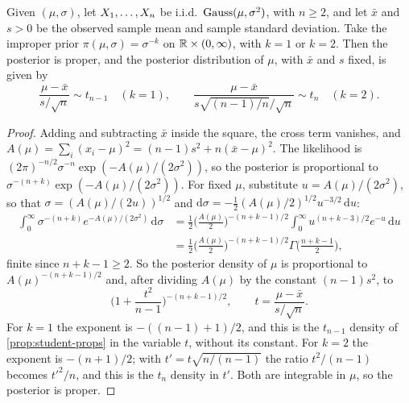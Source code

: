 \begin{proposition}
\label{prop:jeff-t-posterior}
Given $(\mu, \sigma)$, let $X_1, \ldots, X_n$ be i.i.d.\ $\text{Gauss}(\mu, \sigma^2)$, with $n \geq 2$, and let $\bar{x}$ and $s > 0$ be the observed sample mean and sample standard deviation. Take the improper prior $\pi(\mu, \sigma) = \sigma^{-k}$ on $\mathbb{R} \times (0, \infty)$, with $k = 1$ or $k = 2$. Then the posterior is proper, and the posterior distribution of $\mu$, with $\bar{x}$ and $s$ fixed, is given by
\[
\frac{\mu - \bar{x}}{s/\sqrt{n}} \sim t_{n-1} \quad (k = 1), \qquad \frac{\mu - \bar{x}}{s\sqrt{(n-1)/n}\big/\sqrt{n}} \sim t_n \quad (k = 2).
\]
\end{proposition}

\begin{proof}
Adding and subtracting $\bar{x}$ inside the square, the cross term vanishes, and $A(\mu) = \sum_i(x_i - \mu)^2 = (n-1)s^2 + n(\bar{x} - \mu)^2$. The likelihood is $(2\pi)^{-n/2}\sigma^{-n}\exp(-A(\mu)/(2\sigma^2))$, so the posterior is proportional to $\sigma^{-(n+k)}\exp(-A(\mu)/(2\sigma^2))$. For fixed $\mu$, substitute $u = A(\mu)/(2\sigma^2)$, so that $\sigma = (A(\mu)/(2u))^{1/2}$ and $\mathrm{d}\sigma = -\frac12(A(\mu)/2)^{1/2}u^{-3/2}\,\mathrm{d}u$:
\begin{align*}
\int_0^\infty \sigma^{-(n+k)}e^{-A(\mu)/(2\sigma^2)}\,\mathrm{d}\sigma &= \frac12\Big(\frac{A(\mu)}{2}\Big)^{-(n+k-1)/2}\int_0^\infty u^{(n+k-3)/2}e^{-u}\,\mathrm{d}u \\
&= \frac12\Big(\frac{A(\mu)}{2}\Big)^{-(n+k-1)/2}\Gamma\Big(\frac{n+k-1}{2}\Big),
\end{align*}
finite since $n + k - 1 \geq 2$. So the posterior density of $\mu$ is proportional to $A(\mu)^{-(n+k-1)/2}$ and, after dividing $A(\mu)$ by the constant $(n-1)s^2$, to
\[
\Big(1 + \frac{t^2}{n-1}\Big)^{-(n+k-1)/2}, \qquad t = \frac{\mu - \bar{x}}{s/\sqrt{n}}.
\]
For $k = 1$ the exponent is $-((n-1) + 1)/2$, and this is the $t_{n-1}$ density of \cref{prop:student-props} in the variable $t$, without its constant. For $k = 2$ the exponent is $-(n+1)/2$; with $t' = t\sqrt{n/(n-1)}$ the ratio $t^2/(n-1)$ becomes $t'^2/n$, and this is the $t_n$ density in $t'$. Both are integrable in $\mu$, so the posterior is proper.
\end{proof}

